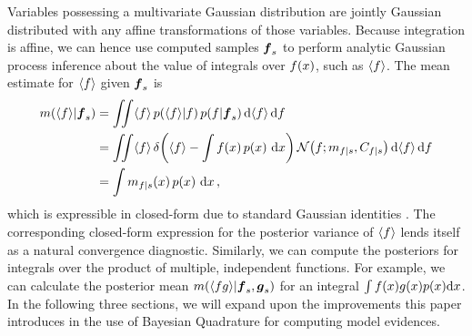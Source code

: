 \documentclass{article} %
\begin{document}
Variables possessing a multivariate Gaussian distribution are jointly Gaussian distributed with any affine transformations of those variables. Because integration is affine, we can hence use computed samples $\vf_s$ to perform analytic Gaussian process inference about the value of integrals over $f(\lfv)$, such as $\inty{f}$. The mean estimate for $\inty{f}$ given $\vf_s$ is
%
\begin{align} \label{eq:mean_inty_f}
\mean{\inty{f}}{\vf_s}
& 
=\iint \inty{f}\,\p{\inty{f}}{f}\p{f}{\vf_s} \ud \inty{f} \,\ud f                                                                                                                                                               \nonumber\\
&
 =\iint \inty{f}\,\dd{\inty{f}}{\int f(\lfv)\,\po{\lfv}\,\ud\lfv}
\N{f}{\meancondfn{f}{s}}{C_{f|s}} \ud \inty{f} \,\ud f \nonumber\\
&
 = \int \meancondfn{f}{s}(\lfv)\,\po{\lfv}\,\ud\lfv
\,,
\end{align}
which is expressible in closed-form due to standard Gaussian identities \cite{BZMonteCarlo}.
%
The corresponding closed-form expression for the posterior variance of $\inty{f}$ lends itself as a natural convergence diagnostic. Similarly, we can compute the posteriors for integrals over the product of multiple, independent functions. For example, we can calculate the posterior mean 
$\mean{\inty{f g}}{\vf_s, \vect{g}_s}$ for an integral $\int f(x) g(x) p(x) \ud x$. 
 In the following three sections, we will expand upon the improvements this paper introduces in the use of Bayesian Quadrature for computing model evidences.
\end{document}
